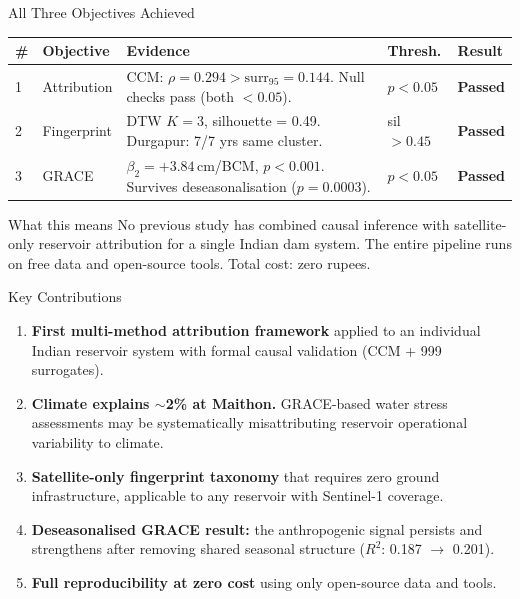 \documentclass[10pt]{beamer}
\begin{document}
\begin{frame}{All Three Objectives Achieved}
  \medskip
  {\footnotesize
  \renewcommand{\arraystretch}{1.3}
  \begin{tabularx}{\textwidth}{@{}C{0.4cm} L{1.5cm} L{4.8cm}
                                 C{1.0cm} C{1.2cm}@{}}
    \toprule
    \textbf{\#} & \textbf{Objective} & \textbf{Evidence} &
    \textbf{Thresh.} & \textbf{Result} \\
     &
      Attribution &
      CCM: $\rho = 0.294 > \text{surr}_{95} = 0.144$.
      Null checks pass (both $< 0.05$). &
      $p < 0.05$ &
      \textbf{Passed} \\

    2 &
      Fingerprint &
      DTW $K = 3$, silhouette = 0.49.
      Durgapur: 7/7 yrs same cluster. &
      sil $> 0.45$ &
      \textbf{Passed} \\

    3 &
      GRACE &
      $\beta_2 = +3.84$\,cm/BCM, $p < 0.001$.
      Survives deseasonalisation ($p = 0.0003$). &
      $p < 0.05$ &
      \textbf{Passed} \\
    \bottomrule
  \end{tabularx}}

  \bigskip
  \begin{block}{\small What this means}
    \small
    No previous study has combined causal inference with
    satellite-only reservoir attribution for a single Indian dam system.
    The entire pipeline runs on free data and open-source tools.
    Total cost: zero rupees.
  \end{block}
\end{frame}


\begin{frame}{Key Contributions}
  \small
  \begin{enumerate}
    \item \textbf{First multi-method attribution framework}
          applied to an individual Indian reservoir system
          with formal causal validation (CCM + 999 surrogates).

    \smallskip
    \item \textbf{Climate explains $\sim$2\% at Maithon.}
          GRACE-based water stress assessments may be systematically
          misattributing reservoir operational variability to climate.

    \smallskip
    \item \textbf{Satellite-only fingerprint taxonomy}
          that requires zero ground infrastructure, applicable
          to any reservoir with Sentinel-1 coverage.

    \smallskip
    \item \textbf{Deseasonalised GRACE result:}
          the anthropogenic signal persists and strengthens
          after removing shared seasonal structure
          ($R^2$: 0.187 $\to$ 0.201).

    \smallskip
    \item \textbf{Full reproducibility at zero cost}
          using only open-source data and tools.
  \end{enumerate}
\end{frame}
\end{document}

